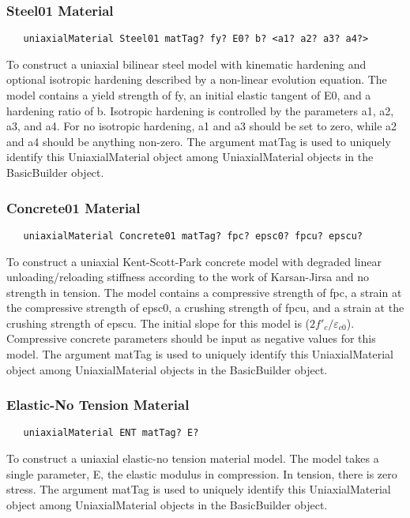 \documentclass[12pt]{article}
\begin{document}
\subsubsection{Steel01 Material}
{\sf\small
\begin{verbatim}
   uniaxialMaterial Steel01 matTag? fy? E0? b? <a1? a2? a3? a4?>
\end{verbatim}
}

\noindent To construct a uniaxial bilinear steel model with kinematic
hardening and optional isotropic hardening described by a non-linear
evolution equation. The model contains a yield strength of fy, an
initial elastic tangent of E0, and a hardening ratio of b. Isotropic hardening is
controlled by the parameters a1, a2, a3, and a4. For no isotropic hardening, a1 and
a3 should be set to zero, while a2 and a4 should be anything non-zero.
The argument matTag is used to uniquely identify this
UniaxialMaterial object among UniaxialMaterial objects in the
BasicBuilder object. 

\subsubsection{Concrete01 Material}
{\sf\small
\begin{verbatim}
   uniaxialMaterial Concrete01 matTag? fpc? epsc0? fpcu? epscu?
\end{verbatim}
}

\noindent To construct a uniaxial Kent-Scott-Park concrete model with degraded 
linear unloading/reloading stiffness according to the work of Karsan-Jirsa and no
strength in tension. The model contains a compressive strength of fpc,
a strain at the compressive strength of epsc0, a crushing strength of
fpcu, and a strain at the crushing strength of epscu. The initial slope
for this model is ($2f'_c/\varepsilon_{c0}$). Compressive
concrete parameters should be input as negative values for
this model. The argument 
matTag is used to uniquely identify this UniaxialMaterial object among 
UniaxialMaterial objects in the BasicBuilder object.

\subsubsection{Elastic-No Tension Material}
{\sf\small
\begin{verbatim}
   uniaxialMaterial ENT matTag? E?
\end{verbatim}
}

\noindent To construct a uniaxial elastic-no tension material model.
The model takes a single parameter, E, the elastic modulus in compression.
In tension, there is zero stress. The argument 
matTag is used to uniquely identify this UniaxialMaterial object among 
UniaxialMaterial objects in the BasicBuilder object.
\end{document}
